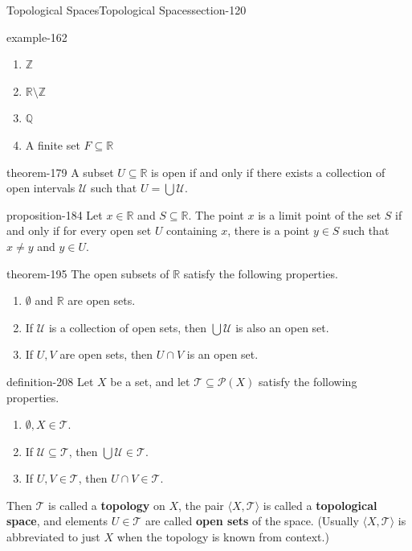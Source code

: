 \documentclass[oneside,10pt,]{article}
\newcommand{\terminology}[1]{\textbf{#1}}
\newcommand{\tuple}[1]{\langle #1 \rangle}
\newcommand{\mb}{\mathbb}
\newcommand{\mc}{\mathcal}
\begin{document}
\begin{sectionptx}{Topological Spaces}{}{Topological Spaces}{}{}{section-120}
\begin{example}{}{example-162}
\begin{enumerate}
\item\hypertarget{li-171}{}\(\mb Z\)%
\item\hypertarget{li-173}{}\(\mb R\setminus\mb Z\)%
\item\hypertarget{li-175}{}\(\mb Q\)%
\item\hypertarget{li-177}{}A finite set \(F\subseteq\mb R\)%
\end{enumerate}
\end{example}
\begin{theorem}{}{}{theorem-179}%
\hypertarget{p-180}{}%
A subset \(U\subseteq\mb R\) is open if and only if there exists a collection of open intervals \(\mc U\) such that \(U=\bigcup\mc U\).%
\end{theorem}
\begin{proposition}{}{}{proposition-184}%
\hypertarget{p-185}{}%
Let \(x\in\mb R\) and \(S\subseteq\mb R\). The point \(x\) is a limit point of the set \(S\) if and only if for every open set \(U\) containing \(x\), there is a point \(y\in S\) such that \(x\not=y\) and \(y\in U\).%
\end{proposition}
\begin{theorem}{}{}{theorem-195}%
\hypertarget{p-196}{}%
The open subsets of \(\mb R\) satisfy the following properties.%
\leavevmode%
\begin{enumerate}
\item\hypertarget{li-199}{}\(\emptyset\) and \(\mb R\) are open sets.%
\item\hypertarget{li-202}{}If \(\mc U\) is a collection of open sets, then \(\bigcup\mc U\) is also an open set.%
\item\hypertarget{li-205}{}If \(U,V\) are open sets, then \(U\cap V\) is an open set.%
\end{enumerate}
\end{theorem}
\begin{definition}{}{definition-208}%
\hypertarget{p-209}{}%
Let \(X\) be a set, and let \(\mc T\subseteq \mc P(X)\) satisfy the following properties.%
\leavevmode%
\begin{enumerate}
\item\hypertarget{li-213}{}\(\emptyset,X\in\mc T\).%
\item\hypertarget{li-215}{}If \(\mc U\subseteq\mc T\), then \(\bigcup\mc U\in\mc T\).%
\item\hypertarget{li-218}{}If \(U,V\in\mc T\), then \(U\cap V\in\mc T\).%
\end{enumerate}
\hypertarget{p-221}{}%
Then \(\mc T\) is called a \terminology{topology} on \(X\), the pair \(\tuple{X,\mc T}\) is called a \terminology{topological space}, and elements \(U\in\mc T\) are called \terminology{open sets} of the space. (Usually \(\tuple{X,\mc T}\) is abbreviated to just \(X\) when the topology is known from context.)%

\end{definition}
\end{sectionptx}
\end{document}
